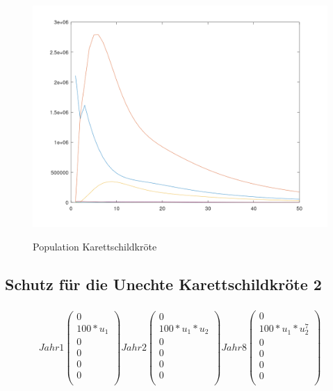 \documentclass{article}
\begin{document}
\begin{figure}[H]
\centering
\includegraphics[scale=0.3]{plotK1c.png}
\label{fig:universe}
\caption{Population Karettschildkröte}
\end{figure}


\subsubsection{}


\subsection{Schutz für die Unechte Karettschildkröte 2}

\subsubsection{}
\[
Jahr 1
  \begin{pmatrix}
    0 \\
    100 * u_1 \\
    0 \\
    0 \\
    0 \\
    0 \\
  \end{pmatrix}
Jahr 2
  \begin{pmatrix}
    0 \\
    100 * u_1 * u_2 \\
    0 \\
    0 \\
    0 \\
    0 \\
  \end{pmatrix}
Jahr 8
  \begin{pmatrix}
    0 \\
    100 * u_1 * u_2^7 \\
    0 \\
    0 \\
    0 \\
    0 \\
  \end{pmatrix}
\]
\end{document}
